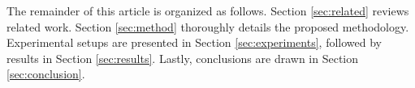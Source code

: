 The remainder of this article is organized as follows. Section \ref{sec:related} reviews related work. Section \ref{sec:method} thoroughly details the proposed methodology. Experimental setups are presented in Section \ref{sec:experiments}, followed by results in Section \ref{sec:results}. Lastly, conclusions are drawn in Section \ref{sec:conclusion}.